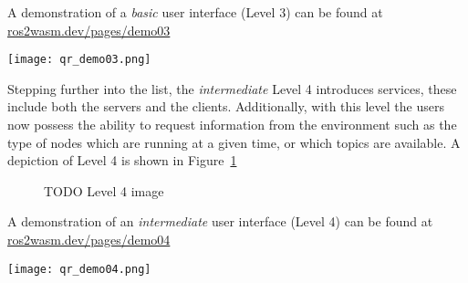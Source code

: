         \begin{tcolorbox}[title=Example 3]
            \begin{minipage}[t]{0.87\linewidth}
                \vspace*{0.5\baselineskip}
                A demonstration of a \textit{basic} user interface (Level 3) can
                be found at \href{https://ros2wasm.dev/pages/demo03/index.html}{\textsf{ros2wasm.dev/pages/demo03}}
            \end{minipage}\hfill%
            \begin{minipage}[t]{0.1\linewidth}
                \vspace*{0pt}
                \texttt{[image: qr\_demo03.png]}
            \end{minipage}
        \end{tcolorbox}



        Stepping further into the list, the \textit{intermediate} Level 4 introduces
        services, these include both the servers and the clients. Additionally,
        with this level the users now possess the ability to request information
        from the environment such as the type of nodes which are running at a
        given time, or which topics are available. A depiction of Level 4 is shown
        in Figure~\ref{fig:ui4}

        \begin{figure}[htbp]
            \centering
            \caption{TODO Level 4 image}\label{fig:ui4}
        \end{figure}

        \begin{tcolorbox}[title=Example 4]
            \begin{minipage}[t]{0.87\linewidth}
                \vspace*{0.5\baselineskip}
                A demonstration of an \textit{intermediate} user interface (Level 4) can
                be found at \href{https://ros2wasm.dev/pages/demo04/index.html}{\textsf{ros2wasm.dev/pages/demo04}}
            \end{minipage}\hfill%
            \begin{minipage}[t]{0.1\linewidth}
                \vspace*{0pt}
                \texttt{[image: qr\_demo04.png]}
            \end{minipage}
        \end{tcolorbox}




